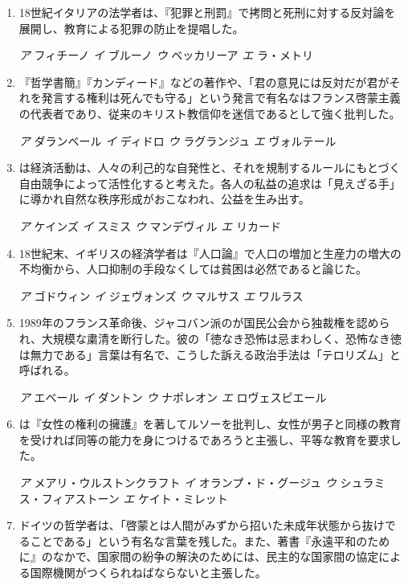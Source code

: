 \documentclass[uplatex,dvipdfmx]{jsarticle}
\newcommand{\sentakusi}[4]{
\hspace{.3zw}
\emph{ア}\hspace{1zw} #1 \hspace{2zw} \emph{イ} \hspace{1zw}#2 \hspace{2zw}\emph{ウ}\hspace{1zw} #3 \hspace{2zw}\emph{エ}\hspace{1zw} #4

}
\begin{document}
\begin{enumerate}



\item   18世紀イタリアの法学者は、『犯罪と刑罰』で拷問と死刑に対する反対論を展開し、教育による犯罪の防止を提唱した。

\sentakusi
{フィチーノ}
{ブルーノ}
{ベッカリーア}
{ラ・メトリ}

\item   『哲学書簡』『カンディード』などの著作や、「君の意見には反対だが君がそれを発言する権利は死んでも守る」という発言で有名なはフランス啓蒙主義の代表者であり、従来のキリスト教信仰を迷信であるとして強く批判した。

\sentakusi
{ダランベール}
{ディドロ}
{ラグランジュ}
{ヴォルテール}


\item   {}は経済活動は、人々の利己的な自発性と、それを規制するルールにもとづく自由競争によって活性化すると考えた。各人の私益の追求は「見えざる手」に導かれ自然な秩序形成がおこなわれ、公益を生み出す。

\sentakusi
{ケインズ}
{スミス}
{マンデヴィル}
{リカード}

\item   18世紀末、イギリスの経済学者は『人口論』で人口の増加と生産力の増大の不均衡から、人口抑制の手段なくしては貧困は必然であると論じた。

\sentakusi
{ゴドウィン}
{ジェヴォンズ}
{マルサス}
{ワルラス}

\item 1989年のフランス革命後、ジャコバン派のが国民公会から独裁権を認められ、大規模な粛清を断行した。彼の「徳なき恐怖は忌まわしく、恐怖なき徳は無力である」言葉は有名で、こうした訴える政治手法は「テロリズム」と呼ばれる。

\sentakusi
{エベール}
{ダントン}
{ナポレオン}
{ロヴェスピエール}


\item   {}は『女性の権利の擁護』を著してルソーを批判し、女性が男子と同様の教育を受ければ同等の能力を身につけるであろうと主張し、平等な教育を要求した。

\sentakusi
{メアリ・ウルストンクラフト}
{オランプ・ド・グージュ}
{シュラミス・フィアストーン}
{ケイト・ミレット}

\item   ドイツの哲学者は、「啓蒙とは人間がみずから招いた未成年状態から抜けでることである」という有名な言葉を残した。また、著書『永遠平和のために』のなかで、国家間の紛争の解決のためには、民主的な国家間の協定による国際機関がつくられねばならないと主張した。


\end{enumerate}
\end{document}
